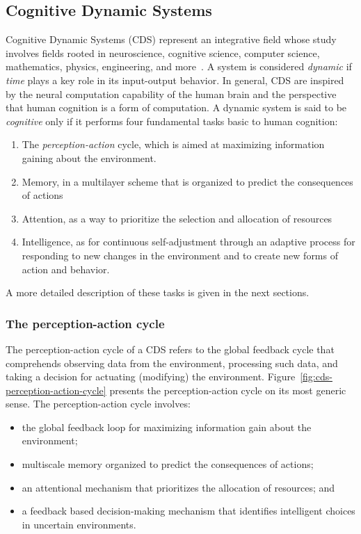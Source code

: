 \documentclass[ENG,PhD]{cinvestav}
\begin{document}
\subsection{Cognitive Dynamic Systems}
Cognitive Dynamic Systems (CDS) represent an integrative field whose study involves fields rooted in neuroscience, cognitive science, computer science, mathematics, physics, engineering, and more~\cite{Haykin2006,Haykin2012}.
A system is considered \emph{dynamic} if \emph{time} plays a key role in its input-output behavior.
In general, CDS are inspired by the neural computation capability of the human brain and the perspective that human cognition is a form of computation.
A dynamic system is said to be \emph{cognitive} only if it performs four fundamental tasks basic to human cognition:
\begin{enumerate}
  \item The \emph{perception-action} cycle, which is aimed at maximizing information gaining about the environment.
  \item Memory, in a multilayer scheme that is organized to predict the consequences of actions
  \item Attention, as a way to prioritize the selection and allocation of resources
  \item Intelligence, as for continuous self-adjustment through an adaptive process for responding to new changes in the environment and to create new forms of action and behavior.
\end{enumerate}

A more detailed description of these tasks is given in the next sections.

\subsubsection*{The perception-action cycle}
The perception-action cycle of a CDS refers to the global feedback cycle that comprehends observing data from the environment, processing such data, and taking a decision for actuating (modifying) the environment.
Figure~\ref{fig:cds-perception-action-cycle} presents the perception-action cycle on its most generic sense.
The perception-action cycle involves:
\begin{itemize}
  \item the global feedback loop for maximizing information gain about the environment;
  \item multiscale memory organized to predict the consequences of actions;
  \item an attentional mechanism that prioritizes the allocation of resources; and
  \item a feedback based decision-making mechanism that identifies intelligent choices in uncertain environments.
\end{itemize}
\end{document}
